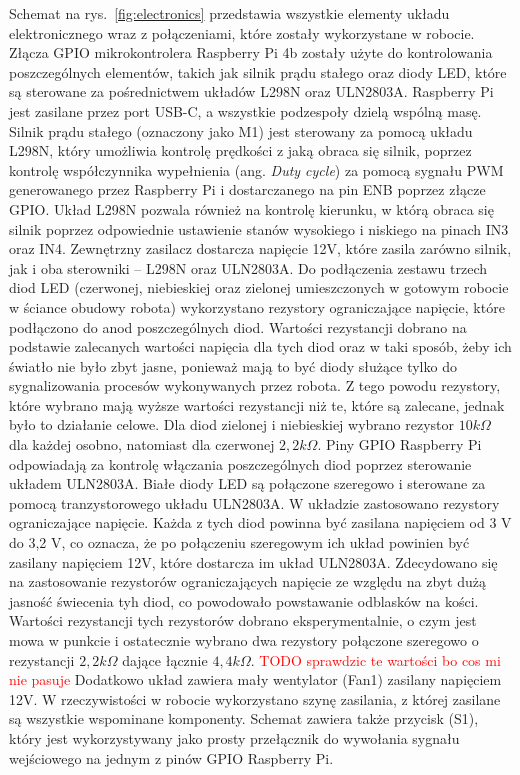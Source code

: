 Schemat na rys.~\ref{fig:electronics} przedstawia wszystkie elementy układu elektronicznego wraz z połączeniami, które zostały wykorzystane w robocie.
Złącza GPIO mikrokontrolera Raspberry Pi 4b zostały użyte do kontrolowania poszczególnych elementów, takich jak silnik prądu stałego oraz diody LED, które są sterowane za 
pośrednictwem układów L298N oraz ULN2803A. Raspberry Pi jest zasilane przez port USB-C, a wszystkie podzespoły dzielą wspólną masę.
Silnik prądu stałego (oznaczony jako M1) jest sterowany za pomocą układu L298N, który umożliwia kontrolę prędkości z jaką obraca się silnik, poprzez kontrolę współczynnika wypełnienia (ang. \textit{Duty cycle})
za pomocą sygnału PWM generowanego przez Raspberry Pi i dostarczanego na pin ENB poprzez złącze GPIO. Układ L298N pozwala również na kontrolę kierunku, w którą obraca się silnik poprzez
odpowiednie ustawienie stanów wysokiego i niskiego na pinach IN3 oraz IN4.
Zewnętrzny zasilacz dostarcza napięcie 12V, które zasila zarówno silnik, jak i oba sterowniki -- L298N oraz ULN2803A.
Do podłączenia zestawu trzech diod LED (czerwonej, niebieskiej oraz zielonej umieszczonych w gotowym robocie w ściance obudowy robota) wykorzystano rezystory ograniczające napięcie, które podłączono 
do anod poszczególnych diod. Wartości rezystancji dobrano na podstawie zalecanych wartości napięcia dla tych diod oraz w taki sposób, żeby ich światło nie było zbyt jasne, ponieważ 
mają to być diody służące tylko do sygnalizowania procesów wykonywanych przez robota. Z tego powodu rezystory, które wybrano mają wyższe wartości rezystancji niż te, które są zalecane, jednak było to
działanie celowe. Dla diod zielonej i niebieskiej wybrano rezystor $10 k\Omega$ dla każdej osobno, natomiast dla czerwonej $2,2 k\Omega$. Piny GPIO Raspberry Pi odpowiadają za kontrolę włączania poszczególnych diod poprzez sterowanie układem ULN2803A.
Białe diody LED są połączone szeregowo i sterowane za pomocą tranzystorowego układu ULN2803A. W układzie zastosowano rezystory ograniczające napięcie. Każda z tych diod powinna być 
zasilana napięciem od 3 V do 3,2 V, co oznacza, że po połączeniu szeregowym ich układ powinien być zasilany napięciem 12V, które dostarcza im układ ULN2803A. Zdecydowano się na zastosowanie
rezystorów ograniczających napięcie ze względu na zbyt dużą jasność świecenia tyh diod, co powodowało powstawanie odblasków na kości. Wartości rezystancji tych rezystorów dobrano eksperymentalnie, o czym jest mowa w punkcie
i ostatecznie wybrano dwa rezystory połączone szeregowo o rezystancji $2,2 k\Omega$ dające łącznie $4,4 k\Omega$. \textcolor{red}{TODO sprawdzic te wartości bo cos mi nie pasuje}
Dodatkowo układ zawiera mały wentylator (Fan1) zasilany napięciem 12V. W rzeczywistości w robocie wykorzystano szynę zasilania, z której zasilane są wszystkie wspominane komponenty. 
Schemat zawiera także przycisk (S1), który jest wykorzystywany jako prosty przełącznik do wywołania sygnału wejściowego na jednym z pinów GPIO Raspberry Pi.

